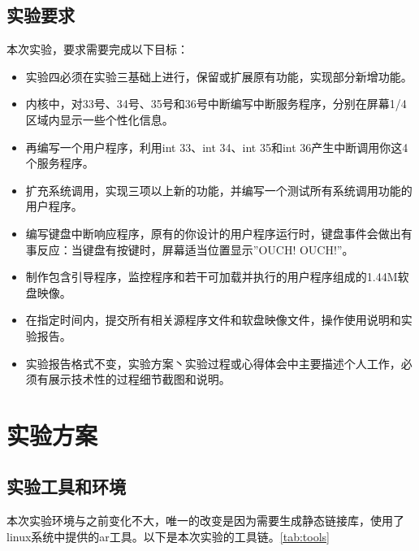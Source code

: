 \documentclass[forprint]{WHUBachelor}
\begin{document}
\section{实验要求}

本次实验，要求需要完成以下目标：\\

\begin{itemize}
  \item 实验四必须在实验三基础上进行，保留或扩展原有功能，实现部分新增功能。
  \item 内核中，对33号、34号、35号和36号中断编写中断服务程序，分别在屏幕1/4区域内显示一些个性化信息。
  \item 再编写一个用户程序，利用int 33、int 34、int 35和int 36产生中断调用你这4个服务程序。
  \item 扩充系统调用，实现三项以上新的功能，并编写一个测试所有系统调用功能的用户程序。
  \item 编写键盘中断响应程序，原有的你设计的用户程序运行时，键盘事件会做出有事反应：当键盘有按键时，屏幕适当位置显示”OUCH! OUCH!”。
  \item 制作包含引导程序，监控程序和若干可加载并执行的用户程序组成的1.44M软盘映像。
  \item 在指定时间内，提交所有相关源程序文件和软盘映像文件，操作使用说明和实验报告。
  \item 实验报告格式不变，实验方案丶实验过程或心得体会中主要描述个人工作，必须有展示技术性的过程细节截图和说明。
\end{itemize}

\chapter{实验方案}

\section{实验工具和环境}

本次实验环境与之前变化不大，唯一的改变是因为需要生成静态链接库，使用了linux系统中提供的ar工具。以下是本次实验的工具链。\autoref{tab:tools}
\end{document}
